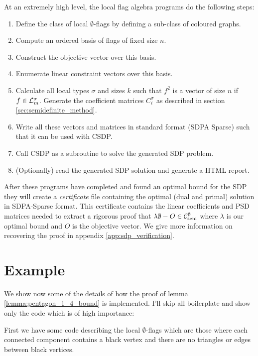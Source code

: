 \noindent At an extremely high level, the local flag algebra programs do the following steps:
\begin{enumerate}
    \item Define the class of local $\emptyset$-flags by defining a sub-class of
        coloured graphs.
    \item Compute an ordered basis of flags of fixed size $n$.
    \item Construct the objective vector over this basis.
    \item Enumerate linear constraint vectors over this basis.
    \item Calculate all local types $\sigma$ and sizes $k$ such that $f^2$ is a vector
        of size $n$ if $f \in \mathcal{L}^\sigma_m$. Generate the coefficient matrices
        $C^\sigma_i$ as described in section \ref{sec:semidefinite_method}.
    \item Write all these vectors and matrices in standard format (SDPA Sparse) such that it
        can be used with CSDP.
    \item Call CSDP as a subroutine to solve the generated SDP problem.
    \item (Optionally) read the generated SDP solution and generate a HTML report.
\end{enumerate}

After these programs have completed and found an optimal bound for the SDP
they will create a \textit{certificate} file containing the optimal (dual and primal)
solution in SDPA-Sparse format. This certificate contains the linear coefficients
and PSD matrices needed to extract a rigorous proof that $\lambda\emptyset - O\in\mathcal{C}_\mathrm{sem}^\emptyset$
where $\lambda$ is our optimal bound and $O$ is the objective vector. We give more
information on recovering the proof in appendix \ref{app:sdp_verification}.

\section*{Example}

We show now some of the details of how the proof of lemma \ref{lemma:pentagon_1_4_bound}
is implemented. I'll skip all boilerplate and show only the code which is of high
importance:

First we have some code describing the local $\emptyset$-flags which are those
where each connected component contains a black vertex and there are no
triangles or edges between black vertices.

